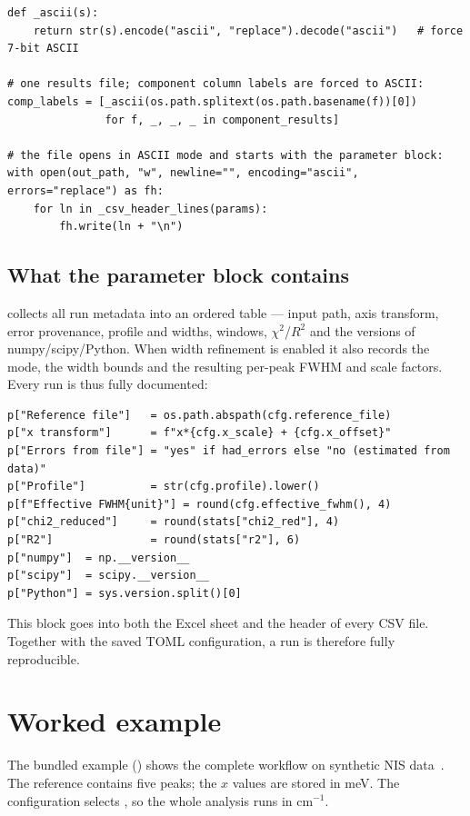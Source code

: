 \documentclass[11pt,a4paper]{article}
\begin{document}
\begin{lstlisting}[style=py]
def _ascii(s):
    return str(s).encode("ascii", "replace").decode("ascii")   # force 7-bit ASCII

# one results file; component column labels are forced to ASCII:
comp_labels = [_ascii(os.path.splitext(os.path.basename(f))[0])
               for f, _, _, _ in component_results]

# the file opens in ASCII mode and starts with the parameter block:
with open(out_path, "w", newline="", encoding="ascii", errors="replace") as fh:
    for ln in _csv_header_lines(params):
        fh.write(ln + "\n")
\end{lstlisting}

\subsection{What the parameter block contains}
 collects all run metadata into an ordered table ---
input path, axis transform, error provenance, profile and widths, windows,
$\chi^2$/$R^2$ and the versions of numpy/scipy/Python. When width refinement is
enabled it also records the mode, the width bounds and the resulting per-peak
FWHM and scale factors. Every run is thus fully documented:

\begin{lstlisting}[style=py]
p["Reference file"]   = os.path.abspath(cfg.reference_file)
p["x transform"]      = f"x*{cfg.x_scale} + {cfg.x_offset}"
p["Errors from file"] = "yes" if had_errors else "no (estimated from data)"
p["Profile"]          = str(cfg.profile).lower()
p[f"Effective FWHM{unit}"] = round(cfg.effective_fwhm(), 4)
p["chi2_reduced"]     = round(stats["chi2_red"], 4)
p["R2"]               = round(stats["r2"], 6)
p["numpy"]  = np.__version__
p["scipy"]  = scipy.__version__
p["Python"] = sys.version.split()[0]
\end{lstlisting}
This block goes into both the Excel  sheet and the header of
every CSV file. Together with the saved TOML configuration, a run is therefore
fully reproducible.

\section{Worked example}
The bundled example () shows the complete workflow on
synthetic NIS data~\citep{Sturhahn1995,Sturhahn2004,ScheidtDurbinSage2005}. The reference  contains
five peaks; the $x$ values are stored in meV. The configuration
 selects , so the whole
analysis runs in $\mathrm{cm}^{-1}$.
\end{document}
